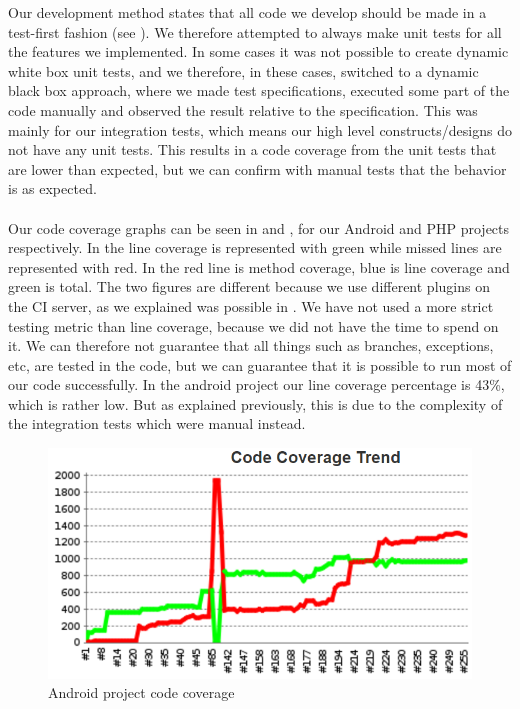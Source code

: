 Our development method states that all code we develop should be made in a test-first fashion (see ). We therefore attempted to always make unit tests for all the features we implemented. In some cases it was not possible to create dynamic white box unit tests, and we therefore, in these cases, switched to a dynamic black box approach, where we made test specifications, executed some part of the code manually and observed the result relative to the specification. This was mainly for our integration tests, which means our high level constructs/designs do not have any unit tests. This results in a code coverage from the unit tests that are lower than expected, but we can confirm with manual tests that the behavior is as expected. 
\\\\
Our code coverage graphs can be seen in  and , for our Android and PHP projects respectively. In  the line coverage is represented with green while missed lines are represented with red. In  the red line is method coverage, blue is line coverage and green is total. The two figures are different because we use different plugins on the CI server, as we explained was possible in . We have not used a more strict testing metric than line coverage, because we did not have the time to spend on it. We can therefore not guarantee that all things such as branches, exceptions, etc, are tested in the code, but we can guarantee that it is possible to run most of our code successfully. In the android project our line coverage percentage is 43\%, which is rather low. But as explained previously, this is due to the complexity of the integration tests which were manual instead. 

\begin{figure}[!htbp]
    \centering
    \includegraphics[width=\textwidth]{graphic/quality_assurance/jenkins_android_code_coverage}
    \caption{Android project code coverage}
    \label{fig:android_project_code_coverage}
\end{figure}
\FloatBarrier


